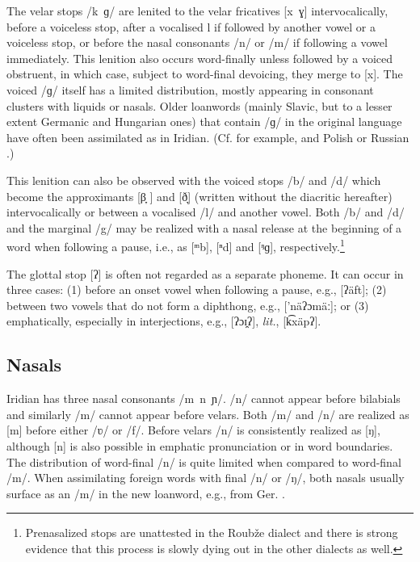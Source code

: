 The velar stops /k~ɡ/ are lenited to the velar fricatives [x~ɣ]
intervocalically, before a voiceless stop, after a vocalised l if followed by
another vowel or a voiceless stop, or before the nasal consonants /n/ or /m/ if
following a vowel immediately. This lenition also occurs word-finally unless
followed by a voiced obstruent, in which case, subject to word-final devoicing,
they merge to [x]. The voiced /ɡ/ itself has a limited distribution, mostly
appearing in consonant clusters with liquids or nasals. Older loanwords (mainly
Slavic, but to a lesser extent Germanic and Hungarian ones) that contain /ɡ/ in
the original language have often been assimilated as  in Iridian. (Cf.
for example,  and Polish  or Russian
.)

This lenition can also be observed with the voiced stops /b/ and /d/ which
become the approximants [β̞	] and [ð̞] (written without the diacritic hereafter)
intervocalically or between a vocalised /l/ and another vowel. Both /b/ and /d/
and the marginal /g/ may be realized with a nasal release at the beginning of a
word when following a pause, i.e., as [ᵐb], [ⁿd] and [ᵑɡ],
respectively.\footnote{Prenasalized stops are unattested in the Roubže dialect
and there is strong evidence that this process is slowly dying out in the other
dialects as well.} 

The glottal stop [ʔ] is often not regarded as a separate phoneme. It can occur
in three cases: (1) before an onset vowel when following a pause, e.g.,
 [ʔäft]; (2) between two vowels that do not form a diphthong,
e.g.,  ['näʔɔmäː]; or (3) emphatically, especially in
interjections, e.g.,  [ʔɔɪ̯ʔ], 
\emph{lit.},  [k͡xäpʔ].

\subsection{Nasals}
Iridian has three nasal consonants /m~n~ɲ/. /n/ cannot appear before bilabials
and similarly /m/ cannot appear before velars. Both /m/ and /n/ are realized as
[m] before either /ʋ/ or /f/. Before velars /n/ is consistently realized as [ŋ],
although [n] is also possible in emphatic pronunciation or in word boundaries.
The distribution of word-final /n/ is quite limited when compared to word-final
/m/. When assimilating foreign words with final /n/ or /ŋ/, both nasals usually
surface as an /m/ in the new loanword, e.g.,  from
Ger. . 

